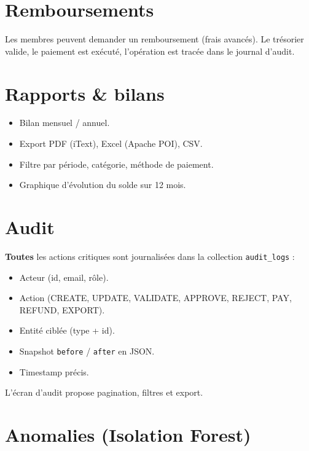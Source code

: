 \documentclass[11pt,a4paper]{report}
\begin{document}
\section{Remboursements}

Les membres peuvent demander un remboursement (frais avancés). Le trésorier
valide, le paiement est exécuté, l'opération est tracée dans le journal d'audit.

\section{Rapports \& bilans}
\begin{itemize}
  \item Bilan mensuel / annuel.
  \item Export PDF (iText), Excel (Apache POI), CSV.
  \item Filtre par période, catégorie, méthode de paiement.
  \item Graphique d'évolution du solde sur 12 mois.
\end{itemize}

\section{Audit}

\textbf{Toutes} les actions critiques sont journalisées dans la collection
\texttt{audit\_logs} :
\begin{itemize}
  \item Acteur (id, email, rôle).
  \item Action (CREATE, UPDATE, VALIDATE, APPROVE, REJECT, PAY, REFUND, EXPORT).
  \item Entité ciblée (type + id).
  \item Snapshot \texttt{before} / \texttt{after} en JSON.
  \item Timestamp précis.
\end{itemize}

L'écran d'audit propose pagination, filtres et export.

\section{Anomalies (Isolation Forest)}
\end{document}
